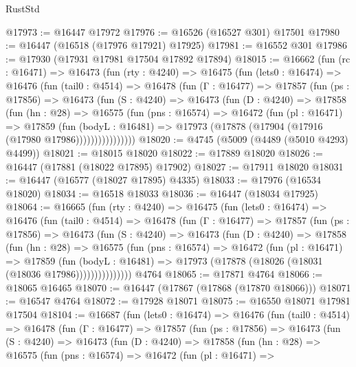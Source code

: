 \begin{lexlean}{RustStd}
\begin{coremodule}
{\begin{coremodule}
{{{{{{{{{{{{{{{{{{{{{{{{{{{{{{{{{{{{{{{{{{{{{{{{{{{{{{{@17973 := @16447 @17972
@17976 := @16526 (@16527 @301) @17501
@17980 := @16447 (@16518 (@17976 @17921) @17925)
@17981 := @16552 @301
@17986 := @17930 (@17931 @17981 @17504 @17892 @17894)
@18015 := @16662
    (fun (rc : @16471) =>
    @16473
      (fun (rty : @4240) =>
      @16475
        (fun (lets0 : @16474) =>
        @16476
          (fun (tail0 : @4514) =>
          @16478
            (fun (Γ : @16477) =>
            @17857
              (fun (ps : @17856) =>
              @16473
                (fun (S : @4240) =>
                @16473
                  (fun (D : @4240) =>
                  @17858
                    (fun (hn : @28) =>
                    @16575
                      (fun (pns : @16574) =>
                      @16472
                        (fun (pl : @16471) =>
                        @17859
                          (fun (bodyL : @16481) =>
                          @17973 (@17878 (@17904 (@17916 (@17980 @17986))))))))))))))))
@18020 := @4745 (@5009 (@4489 (@5010 @4293) @4499))
@18021 := @18015 @18020
@18022 := @17889 @18020
@18026 := @16447 (@17881 (@18022 @17895) @17902)
@18027 := @17911 @18020
@18031 := @16447 (@16577 (@18027 @17895) @4335)
@18033 := @17976 (@16534 @18020)
@18034 := @16518 @18033
@18036 := @16447 (@18034 @17925)
@18064 := @16665
    (fun (rty : @4240) =>
    @16475
      (fun (lets0 : @16474) =>
      @16476
        (fun (tail0 : @4514) =>
        @16478
          (fun (Γ : @16477) =>
          @17857
            (fun (ps : @17856) =>
            @16473
              (fun (S : @4240) =>
              @16473
                (fun (D : @4240) =>
                @17858
                  (fun (hn : @28) =>
                  @16575
                    (fun (pns : @16574) =>
                    @16472
                      (fun (pl : @16471) =>
                      @17859
                        (fun (bodyL : @16481) =>
                        @17973 (@17878 (@18026 (@18031 (@18036 @17986)))))))))))))))
    @4764
@18065 := @17871 @4764
@18066 := @18065 @16465
@18070 := @16447 (@17867 (@17868 (@17870 @18066)))
@18071 := @16547 @4764
@18072 := @17928 @18071
@18075 := @16550 @18071 @17981 @17504
@18104 := @16687
    (fun (lets0 : @16474) =>
    @16476
      (fun (tail0 : @4514) =>
      @16478
        (fun (Γ : @16477) =>
        @17857
          (fun (ps : @17856) =>
          @16473
            (fun (S : @4240) =>
            @16473
              (fun (D : @4240) =>
              @17858
                (fun (hn : @28) =>
                @16575
                  (fun (pns : @16574) =>
                  @16472
                    (fun (pl : @16471) =>
}}}}}}}}}}}}}}}}}}}}}}}}}}}}}}}}}}}}}}}}}}}}}}}}}}}}}}}
\end{coremodule}}
\end{coremodule}
\end{lexlean}
